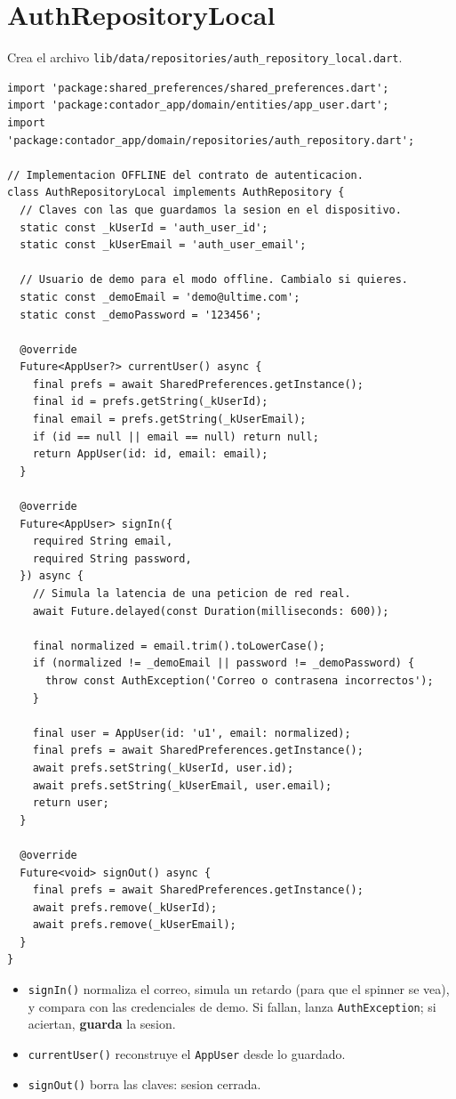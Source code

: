 \documentclass[11pt,a4paper,oneside]{book}
\newcommand{\file}[1]{\texttt{\textcolor{brandDark}{#1}}}
\begin{document}
\section{AuthRepositoryLocal}
\begin{wherebox}
Crea el archivo \file{lib/data/repositories/auth\_repository\_local.dart}.
\end{wherebox}

\begin{lstlisting}
import 'package:shared_preferences/shared_preferences.dart';
import 'package:contador_app/domain/entities/app_user.dart';
import 'package:contador_app/domain/repositories/auth_repository.dart';

// Implementacion OFFLINE del contrato de autenticacion.
class AuthRepositoryLocal implements AuthRepository {
  // Claves con las que guardamos la sesion en el dispositivo.
  static const _kUserId = 'auth_user_id';
  static const _kUserEmail = 'auth_user_email';

  // Usuario de demo para el modo offline. Cambialo si quieres.
  static const _demoEmail = 'demo@ultime.com';
  static const _demoPassword = '123456';

  @override
  Future<AppUser?> currentUser() async {
    final prefs = await SharedPreferences.getInstance();
    final id = prefs.getString(_kUserId);
    final email = prefs.getString(_kUserEmail);
    if (id == null || email == null) return null;
    return AppUser(id: id, email: email);
  }

  @override
  Future<AppUser> signIn({
    required String email,
    required String password,
  }) async {
    // Simula la latencia de una peticion de red real.
    await Future.delayed(const Duration(milliseconds: 600));

    final normalized = email.trim().toLowerCase();
    if (normalized != _demoEmail || password != _demoPassword) {
      throw const AuthException('Correo o contrasena incorrectos');
    }

    final user = AppUser(id: 'u1', email: normalized);
    final prefs = await SharedPreferences.getInstance();
    await prefs.setString(_kUserId, user.id);
    await prefs.setString(_kUserEmail, user.email);
    return user;
  }

  @override
  Future<void> signOut() async {
    final prefs = await SharedPreferences.getInstance();
    await prefs.remove(_kUserId);
    await prefs.remove(_kUserEmail);
  }
}
\end{lstlisting}

\begin{whatbox}
\begin{itemize}
  \item \texttt{signIn()} normaliza el correo, simula un retardo (para que el spinner
        se vea), y compara con las credenciales de demo. Si fallan, lanza
        \texttt{AuthException}; si aciertan, \textbf{guarda} la sesion.
  \item \texttt{currentUser()} reconstruye el \texttt{AppUser} desde lo guardado.
  \item \texttt{signOut()} borra las claves: sesion cerrada.
\end{itemize}
\end{whatbox}
\end{document}
